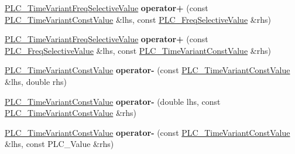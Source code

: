 \begin{DoxyCompactItemize}
\item 
\hypertarget{classns3_1_1PLC__TimeVariantConstValue_aa0651ee3ee605b4d029fcb89d93b5dd2}{\hyperlink{classns3_1_1PLC__TimeVariantFreqSelectiveValue}{\-P\-L\-C\-\_\-\-Time\-Variant\-Freq\-Selective\-Value} {\bfseries operator+} (const \hyperlink{classns3_1_1PLC__TimeVariantConstValue}{\-P\-L\-C\-\_\-\-Time\-Variant\-Const\-Value} \&lhs, const \hyperlink{classns3_1_1PLC__FreqSelectiveValue}{\-P\-L\-C\-\_\-\-Freq\-Selective\-Value} \&rhs)}\label{classns3_1_1PLC__TimeVariantConstValue_aa0651ee3ee605b4d029fcb89d93b5dd2}

\item 
\hypertarget{classns3_1_1PLC__TimeVariantConstValue_a2af198eff18574f291b5ecdbfd131851}{\hyperlink{classns3_1_1PLC__TimeVariantFreqSelectiveValue}{\-P\-L\-C\-\_\-\-Time\-Variant\-Freq\-Selective\-Value} {\bfseries operator+} (const \hyperlink{classns3_1_1PLC__FreqSelectiveValue}{\-P\-L\-C\-\_\-\-Freq\-Selective\-Value} \&lhs, const \hyperlink{classns3_1_1PLC__TimeVariantConstValue}{\-P\-L\-C\-\_\-\-Time\-Variant\-Const\-Value} \&rhs)}\label{classns3_1_1PLC__TimeVariantConstValue_a2af198eff18574f291b5ecdbfd131851}

\item 
\hypertarget{classns3_1_1PLC__TimeVariantConstValue_ab191f3fe641d3b197269d5973ed302ff}{\hyperlink{classns3_1_1PLC__TimeVariantConstValue}{\-P\-L\-C\-\_\-\-Time\-Variant\-Const\-Value} {\bfseries operator-\/} (const \hyperlink{classns3_1_1PLC__TimeVariantConstValue}{\-P\-L\-C\-\_\-\-Time\-Variant\-Const\-Value} \&lhs, double rhs)}\label{classns3_1_1PLC__TimeVariantConstValue_ab191f3fe641d3b197269d5973ed302ff}

\item 
\hypertarget{classns3_1_1PLC__TimeVariantConstValue_a3f86c206914729ada3a3a8d0e1f95b21}{\hyperlink{classns3_1_1PLC__TimeVariantConstValue}{\-P\-L\-C\-\_\-\-Time\-Variant\-Const\-Value} {\bfseries operator-\/} (double lhs, const \hyperlink{classns3_1_1PLC__TimeVariantConstValue}{\-P\-L\-C\-\_\-\-Time\-Variant\-Const\-Value} \&rhs)}\label{classns3_1_1PLC__TimeVariantConstValue_a3f86c206914729ada3a3a8d0e1f95b21}

\item 
\hypertarget{classns3_1_1PLC__TimeVariantConstValue_ab5442051e84c62af878e6fde3482df7f}{\hyperlink{classns3_1_1PLC__TimeVariantConstValue}{\-P\-L\-C\-\_\-\-Time\-Variant\-Const\-Value} {\bfseries operator-\/} (const \hyperlink{classns3_1_1PLC__TimeVariantConstValue}{\-P\-L\-C\-\_\-\-Time\-Variant\-Const\-Value} \&lhs, const \-P\-L\-C\-\_\-\-Value \&rhs)}\label{classns3_1_1PLC__TimeVariantConstValue_ab5442051e84c62af878e6fde3482df7f}


\end{DoxyCompactItemize}
